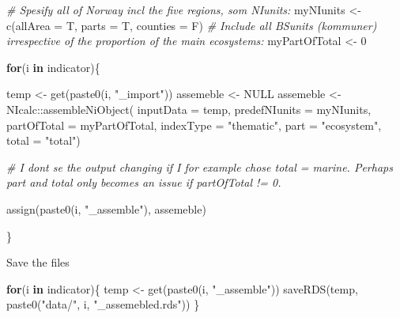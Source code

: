 \documentclass[
]{book}
\newenvironment{Shaded}{\begin{snugshade}}{\end{snugshade}}
\newcommand{\AttributeTok}[1]{\textcolor[rgb]{0.77,0.63,0.00}{#1}}
\newcommand{\CommentTok}[1]{\textcolor[rgb]{0.56,0.35,0.01}{\textit{#1}}}
\newcommand{\ConstantTok}[1]{\textcolor[rgb]{0.00,0.00,0.00}{#1}}
\newcommand{\ControlFlowTok}[1]{\textcolor[rgb]{0.13,0.29,0.53}{\textbf{#1}}}
\newcommand{\DecValTok}[1]{\textcolor[rgb]{0.00,0.00,0.81}{#1}}
\newcommand{\FunctionTok}[1]{\textcolor[rgb]{0.00,0.00,0.00}{#1}}
\newcommand{\NormalTok}[1]{#1}
\newcommand{\OtherTok}[1]{\textcolor[rgb]{0.56,0.35,0.01}{#1}}
\newcommand{\SpecialCharTok}[1]{\textcolor[rgb]{0.00,0.00,0.00}{#1}}
\newcommand{\StringTok}[1]{\textcolor[rgb]{0.31,0.60,0.02}{#1}}
\begin{document}
\begin{Shaded}
\begin{Highlighting}[]
\CommentTok{\# Spesify all of Norway incl the five regions, som NIunits:}
\NormalTok{myNIunits }\OtherTok{\textless{}{-}} \FunctionTok{c}\NormalTok{(}\AttributeTok{allArea =}\NormalTok{ T, }\AttributeTok{parts =}\NormalTok{ T, }\AttributeTok{counties =}\NormalTok{ F)}
\CommentTok{\# Include all BSunits (kommuner) irrespective of the proportion of the main ecosystems:}
\NormalTok{myPartOfTotal }\OtherTok{\textless{}{-}} \DecValTok{0}

\ControlFlowTok{for}\NormalTok{(i }\ControlFlowTok{in}\NormalTok{ indicator)\{}

\NormalTok{  temp }\OtherTok{\textless{}{-}} \FunctionTok{get}\NormalTok{(}\FunctionTok{paste0}\NormalTok{(i, }\StringTok{"\_import"}\NormalTok{))}
\NormalTok{  assemeble }\OtherTok{\textless{}{-}} \ConstantTok{NULL}
\NormalTok{  assemeble }\OtherTok{\textless{}{-}}\NormalTok{ NIcalc}\SpecialCharTok{::}\FunctionTok{assembleNiObject}\NormalTok{(}
    \AttributeTok{inputData =}\NormalTok{ temp,}
    \AttributeTok{predefNIunits =}\NormalTok{ myNIunits, }
    \AttributeTok{partOfTotal =}\NormalTok{ myPartOfTotal, }
    \AttributeTok{indexType =} \StringTok{"thematic"}\NormalTok{,}
    \AttributeTok{part =} \StringTok{"ecosystem"}\NormalTok{,}
    \AttributeTok{total =} \StringTok{"total"}\NormalTok{)  }
  
  \CommentTok{\# I dont se the output changing if I for example chose total = marine. Perhaps \textquotesingle{}part\textquotesingle{} and \textquotesingle{}total\textquotesingle{} only becomes an issue if partOfTotal != 0.}
  
  \FunctionTok{assign}\NormalTok{(}\FunctionTok{paste0}\NormalTok{(i, }\StringTok{"\_assemble"}\NormalTok{), assemeble)}

\NormalTok{\}}
\end{Highlighting}
\end{Shaded}

Save the files

\begin{Shaded}
\begin{Highlighting}[]

\ControlFlowTok{for}\NormalTok{(i }\ControlFlowTok{in}\NormalTok{ indicator)\{}
\NormalTok{  temp }\OtherTok{\textless{}{-}} \FunctionTok{get}\NormalTok{(}\FunctionTok{paste0}\NormalTok{(i, }\StringTok{"\_assemble"}\NormalTok{))}
  \FunctionTok{saveRDS}\NormalTok{(temp, }\FunctionTok{paste0}\NormalTok{(}\StringTok{"data/"}\NormalTok{, i, }\StringTok{"\_assemebled.rds"}\NormalTok{))}
\NormalTok{\}}
\end{Highlighting}
\end{Shaded}
\end{document}
